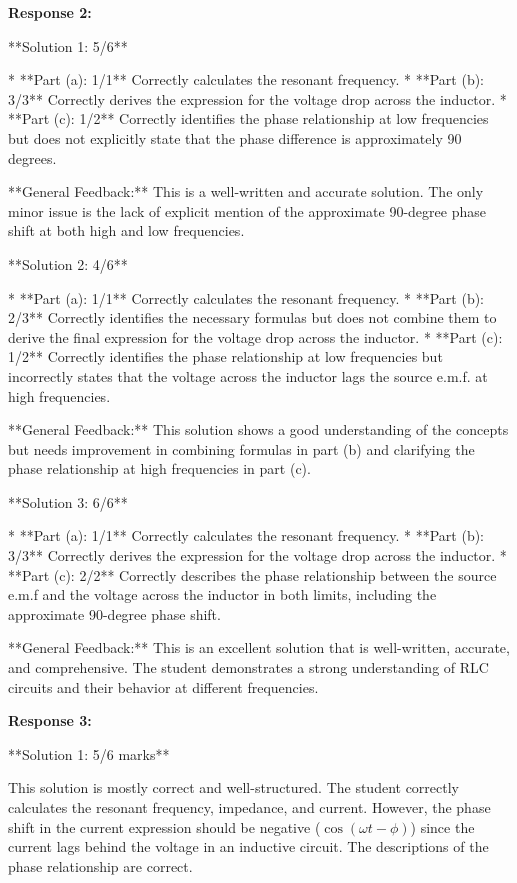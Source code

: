 \documentclass[a4paper,11pt]{article}
\begin{document}
\textbf{Response 2:}

**Solution 1: 5/6**

*   **Part (a): 1/1** Correctly calculates the resonant frequency.
*   **Part (b): 3/3** Correctly derives the expression for the voltage drop across the inductor.
*   **Part (c): 1/2** Correctly identifies the phase relationship at low frequencies but does not explicitly state that the phase difference is approximately 90 degrees.

**General Feedback:** This is a well-written and accurate solution. The only minor issue is the lack of explicit mention of the approximate 90-degree phase shift at both high and low frequencies.

**Solution 2: 4/6**

*   **Part (a): 1/1** Correctly calculates the resonant frequency.
*   **Part (b): 2/3** Correctly identifies the necessary formulas but does not combine them to derive the final expression for the voltage drop across the inductor.
*   **Part (c): 1/2** Correctly identifies the phase relationship at low frequencies but incorrectly states that the voltage across the inductor lags the source e.m.f. at high frequencies.

**General Feedback:** This solution shows a good understanding of the concepts but needs improvement in combining formulas in part (b) and clarifying the phase relationship at high frequencies in part (c).

**Solution 3: 6/6**

*   **Part (a): 1/1** Correctly calculates the resonant frequency.
*   **Part (b): 3/3** Correctly derives the expression for the voltage drop across the inductor.
*   **Part (c): 2/2** Correctly describes the phase relationship between the source e.m.f and the voltage across the inductor in both limits, including the approximate 90-degree phase shift.

**General Feedback:** This is an excellent solution that is well-written, accurate, and comprehensive. The student demonstrates a strong understanding of RLC circuits and their behavior at different frequencies.


\textbf{Response 3:}

**Solution 1: 5/6 marks**

This solution is mostly correct and well-structured. The student correctly calculates the resonant frequency, impedance, and current. However, the phase shift in the current expression should be negative (\( \cos(\omega t - \phi) \)) since the current lags behind the voltage in an inductive circuit. The descriptions of the phase relationship are correct.
\end{document}
